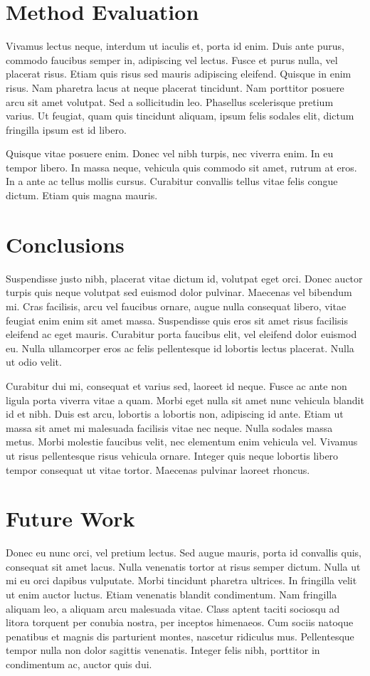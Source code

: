 \section{Method Evaluation}
Vivamus lectus neque, interdum ut iaculis et, porta id enim. Duis ante purus, commodo faucibus semper in, adipiscing vel lectus. Fusce et purus nulla, vel placerat risus. Etiam quis risus sed mauris adipiscing eleifend. Quisque in enim risus. Nam pharetra lacus at neque placerat tincidunt. Nam porttitor posuere arcu sit amet volutpat. Sed a sollicitudin leo. Phasellus scelerisque pretium varius. Ut feugiat, quam quis tincidunt aliquam, ipsum felis sodales elit, dictum fringilla ipsum est id libero.

Quisque vitae posuere enim. Donec vel nibh turpis, nec viverra enim. In eu tempor libero. In massa neque, vehicula quis commodo sit amet, rutrum at eros. In a ante ac tellus mollis cursus. Curabitur convallis tellus vitae felis congue dictum. Etiam quis magna mauris.

\section{Conclusions}
Suspendisse justo nibh, placerat vitae dictum id, volutpat eget orci. Donec auctor turpis quis neque volutpat sed euismod dolor pulvinar. Maecenas vel bibendum mi. Cras facilisis, arcu vel faucibus ornare, augue nulla consequat libero, vitae feugiat enim enim sit amet massa. Suspendisse quis eros sit amet risus facilisis eleifend ac eget mauris. Curabitur porta faucibus elit, vel eleifend dolor euismod eu. Nulla ullamcorper eros ac felis pellentesque id lobortis lectus placerat. Nulla ut odio velit.

Curabitur dui mi, consequat et varius sed, laoreet id neque. Fusce ac ante non ligula porta viverra vitae a quam. Morbi eget nulla sit amet nunc vehicula blandit id et nibh. Duis est arcu, lobortis a lobortis non, adipiscing id ante. Etiam ut massa sit amet mi malesuada facilisis vitae nec neque. Nulla sodales massa metus. Morbi molestie faucibus velit, nec elementum enim vehicula vel. Vivamus ut risus pellentesque risus vehicula ornare. Integer quis neque lobortis libero tempor consequat ut vitae tortor. Maecenas pulvinar laoreet rhoncus.

\section{Future Work}
Donec eu nunc orci, vel pretium lectus. Sed augue mauris, porta id convallis quis, consequat sit amet lacus. Nulla venenatis tortor at risus semper dictum. Nulla ut mi eu orci dapibus vulputate. Morbi tincidunt pharetra ultrices. In fringilla velit ut enim auctor luctus. Etiam venenatis blandit condimentum. Nam fringilla aliquam leo, a aliquam arcu malesuada vitae. Class aptent taciti sociosqu ad litora torquent per conubia nostra, per inceptos himenaeos. Cum sociis natoque penatibus et magnis dis parturient montes, nascetur ridiculus mus. Pellentesque tempor nulla non dolor sagittis venenatis. Integer felis nibh, porttitor in condimentum ac, auctor quis dui.

